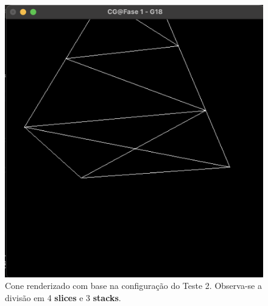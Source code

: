 \documentclass[12pt,a4paper]{report}%
\begin{document}
\begin{enumerate}
\begin{figure}[H]
\begin{minipage}{0.49\linewidth}
        \includegraphics[width=\linewidth]{images/Teste2.png}
        \caption[Teste 2 - Desenho]{Cone renderizado com base na configuração do Teste 2. Observa-se a divisão em 4 \textbf{slices} e 3 \textbf{stacks}.}
        \label{fig:cena-teste2}
    \end{minipage}
\end{figure}

\newpage


\end{enumerate}
\end{document}
